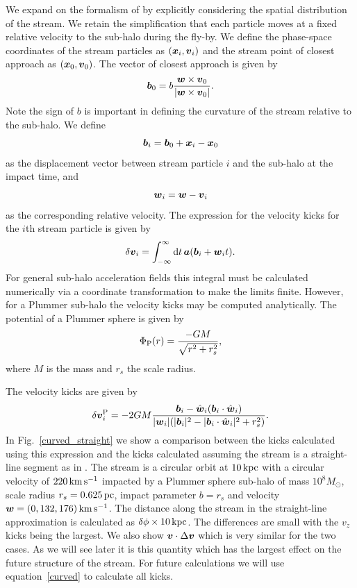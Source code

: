 \documentclass[useAMS,usenatbib,fleqn,a4paper]{mn2e}
\def\d{{\rm d}}
\def\kpc{\,{\rm kpc}}
\def\pc{\,{\rm pc}}
\def\kms{\,{\rm km\,s^{-1}}}
\newcommand{\bs}[1]{\bmath{#1}}
\begin{document}
We expand on the formalism of \cite{ErkalBelokurov} by explicitly considering the spatial distribution of the stream. We retain the simplification that each particle moves at a fixed relative velocity to the sub-halo during the fly-by. We define the phase-space coordinates of the stream particles as $(\bs{x}_i,\bs{v}_i)$ and the stream point of closest approach as $(\bs{x}_0,\bs{v}_0)$. The vector of closest approach is given by
\begin{equation}
\bs{b}_0=b\frac{\bs{w}\times\bs{v}_0}{|\bs{w}\times\bs{v}_0|}.
\end{equation}
Note the sign of $b$ is important in defining the curvature of the stream relative to the sub-halo. We define
\begin{equation}
\bs{b}_i = \bs{b}_0+\bs{x}_i-\bs{x}_0
\end{equation}
as the displacement vector between stream particle $i$ and the sub-halo at the impact time, and
\begin{equation}
\bs{w}_i=\bs{w}-\bs{v}_i
\end{equation}
as the corresponding relative velocity. The expression for the velocity kicks for the $i$th stream particle is given by
\begin{equation}
\delta\bs{v}_i = \int_{-\infty}^{\infty} \d t\,\bs{a}(\bs{b}_i+\bs{w}_it).
\end{equation}For general sub-halo acceleration fields this integral must be calculated numerically via a coordinate transformation to make the limits finite. However, for a Plummer sub-halo the velocity kicks may be computed analytically. The potential of a Plummer sphere is given by
\begin{equation}
\Phi_{\rm P}(r) = \frac{-GM}{\sqrt{r^2+r_s^2}},
\end{equation}
where $M$ is the mass and $r_s$ the scale radius.

The velocity kicks are given by
\begin{equation}
\delta\bs{v}^{\rm P}_i = -2GM
\frac{\bs{b}_i-\hat{\bs{w}}_i(\bs{b}_i\cdot\hat{\bs{w}}_i)}
{|\bs{w}_i|
(|\bs{b}_i|^2
-|\bs{b}_i\cdot\hat{\bs{w}}_i|^2
+r_s^2)}.
\label{curved}
\end{equation}
In Fig.~\ref{curved_straight} we show a comparison between the kicks calculated using this expression and the kicks calculated assuming the stream is a straight-line segment as in \cite{ErkalBelokurov}. The stream is a circular orbit at $10\kpc$ with a circular velocity of $220\kms$ impacted by a Plummer sphere sub-halo of mass $10^8M_\odot$, scale radius $r_s=0.625\pc$, impact parameter $b=r_s$ and velocity $\bs{w}=(0,132,176)\kms$. The distance along the stream in the straight-line approximation is calculated as $\delta\phi\times10\kpc$. The differences are small with the $v_z$ kicks being the largest. We also show $\bs{v}\cdot\Delta\bs{v}$ which is very similar for the two cases. As we will see later it is this quantity which has the largest effect on the future structure of the stream. For future calculations we will use equation~\eqref{curved} to calculate all kicks.
\end{document}
